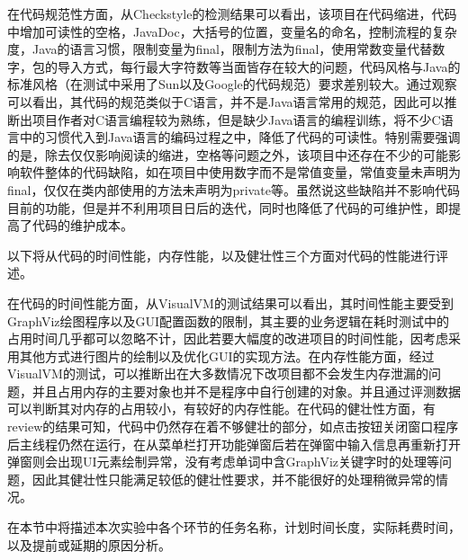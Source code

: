 在代码规范性方面，从Checkstyle的检测结果可以看出，该项目在代码缩进，代码中增加可读性的空格，JavaDoc，大括号的位置，变量名的命名，控制流程的复杂度，Java的语言习惯，限制变量为final，限制方法为final，使用常数变量代替数字，包的导入方式，每行最大字符数等当面皆存在较大的问题，代码风格与Java的标准风格（在测试中采用了Sun以及Google的代码规范）要求差别较大。通过观察可以看出，其代码的规范类似于C语言，并不是Java语言常用的规范，因此可以推断出项目作者对C语言编程较为熟练，但是缺少Java语言的编程训练，将不少C语言中的习惯代入到Java语言的编码过程之中，降低了代码的可读性。特别需要强调的是，除去仅仅影响阅读的缩进，空格等问题之外，该项目中还存在不少的可能影响软件整体的代码缺陷，如在项目中使用数字而不是常值变量，常值变量未声明为final，仅仅在类内部使用的方法未声明为private等。虽然说这些缺陷并不影响代码目前的功能，但是并不利用项目日后的迭代，同时也降低了代码的可维护性，即提高了代码的维护成本。

以下将从代码的时间性能，内存性能，以及健壮性三个方面对代码的性能进行评述。

在代码的时间性能方面，从VisualVM的测试结果可以看出，其时间性能主要受到GraphViz绘图程序以及GUI配置函数的限制，其主要的业务逻辑在耗时测试中的占用时间几乎都可以忽略不计，因此若要大幅度的改进项目的时间性能，因考虑采用其他方式进行图片的绘制以及优化GUI的实现方法。在内存性能方面，经过VisualVM的测试，可以推断出在大多数情况下改项目都不会发生内存泄漏的问题，并且占用内存的主要对象也并不是程序中自行创建的对象。并且通过评测数据可以判断其对内存的占用较小，有较好的内存性能。在代码的健壮性方面，有review的结果可知，代码中仍然存在着不够健壮的部分，如点击按钮关闭窗口程序后主线程仍然在运行，在从菜单栏打开功能弹窗后若在弹窗中输入信息再重新打开弹窗则会出现UI元素绘制异常，没有考虑单词中含GraphViz关键字时的处理等问题，因此其健壮性只能满足较低的健壮性要求，并不能很好的处理稍微异常的情况。

在本节中将描述本次实验中各个环节的任务名称，计划时间长度，实际耗费时间，以及提前或延期的原因分析。

